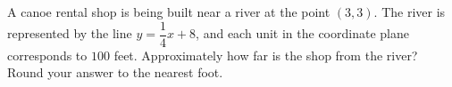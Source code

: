 A canoe rental shop is being built near a river at the point $(3,3)$. The river is represented by the line $y=\dfrac14x+8$, and each unit in the coordinate plane corresponds to $100$ feet. Approximately how far is the shop from the river? Round your answer to the nearest foot.
